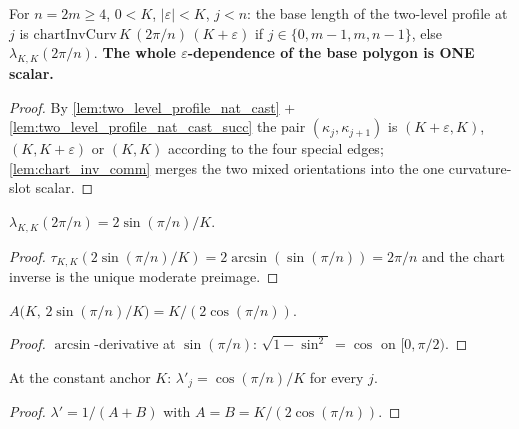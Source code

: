 \begin{lemma}
  \label{lem:jacobian_base_len_two_level}
  For $n = 2m \ge 4$, $0 < K$, $|\varepsilon| < K$, $j < n$: the base length
  of the two-level profile at $j$ is
  $\mathrm{chartInvCurv}\,K\,(2\pi/n)\,(K+\varepsilon)$ if
  $j \in \{0, m{-}1, m, n{-}1\}$, else $\lambda_{K,K}(2\pi/n)$.
  \textbf{The whole $\varepsilon$-dependence of the base polygon is ONE
  scalar.}
\end{lemma}
\begin{proof}

\leanok
  By \cref{lem:two_level_profile_nat_cast} + \cref{lem:two_level_profile_nat_cast_succ}
  the pair $(\kappa_j, \kappa_{j+1})$ is $(K{+}\varepsilon, K)$,
  $(K, K{+}\varepsilon)$ or $(K, K)$ according to the four special edges;
  \cref{lem:chart_inv_comm} merges the two mixed orientations into the one
  curvature-slot scalar.
\end{proof}

\begin{lemma}
  \label{lem:chart_inv_const}
  $\lambda_{K,K}(2\pi/n) = 2\sin(\pi/n)/K$.
\end{lemma}
\begin{proof}

\leanok
  $\tau_{K,K}(2\sin(\pi/n)/K) = 2\arcsin(\sin(\pi/n)) = 2\pi/n$ and the
  chart inverse is the unique moderate preimage.
\end{proof}

\begin{lemma}
  \label{lem:chart_slot_deriv_const}
  $A\bigl(K,\, 2\sin(\pi/n)/K\bigr) = K/(2\cos(\pi/n))$.
\end{lemma}
\begin{proof}

\leanok
  $\arcsin$-derivative at $\sin(\pi/n)$:
  $\sqrt{1 - \sin^2} = \cos$ on $[0, \pi/2)$.
\end{proof}

\begin{lemma}
  \label{lem:jacobian_lambda_const}
  At the constant anchor $K$: $\lambda'_j = \cos(\pi/n)/K$ for every $j$.
\end{lemma}
\begin{proof}

\leanok
  $\lambda' = 1/(A+B)$ with $A = B = K/(2\cos(\pi/n))$.
\end{proof}

